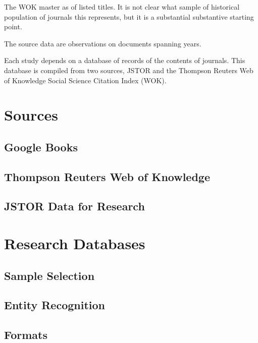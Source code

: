 \documentclass [PhD] {uclathes}
\begin{document}
The WOK master as of listed titles. It is not clear what sample of
historical population of journals this represents, but it is a
substantial substantive starting point.

The source data are observations on documents spanning years.

Each study depends on a database of records of the contents of journals.
This database is compiled from two sources, JSTOR and the Thompson
Reuters Web of Knowledge Social Science Citation Index (WOK).

\section{Sources}\label{sources}

\subsection{Google Books}\label{google-books}

\subsection{Thompson Reuters Web of
Knowledge}\label{thompson-reuters-web-of-knowledge}

\subsection{JSTOR Data for Research}\label{jstor-data-for-research}

\section{Research Databases}\label{research-databases}

\subsection{Sample Selection}\label{sample-selection}

\subsection{Entity Recognition}\label{entity-recognition}

\subsection{Formats}\label{formats}
\end{document}
